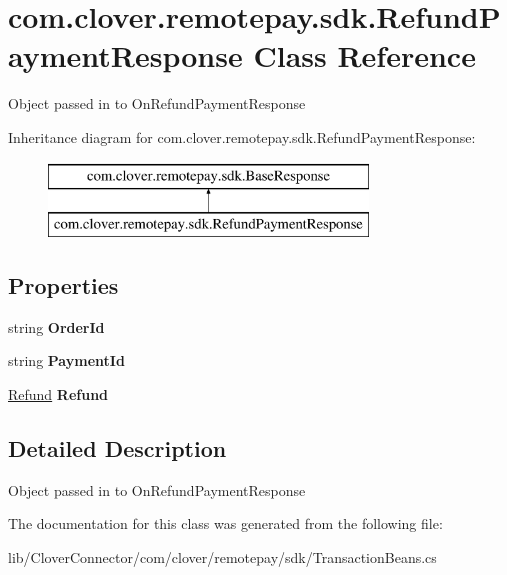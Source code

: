\hypertarget{classcom_1_1clover_1_1remotepay_1_1sdk_1_1_refund_payment_response}{}\section{com.\+clover.\+remotepay.\+sdk.\+Refund\+Payment\+Response Class Reference}
\label{classcom_1_1clover_1_1remotepay_1_1sdk_1_1_refund_payment_response}


Object passed in to On\+Refund\+Payment\+Response  


Inheritance diagram for com.\+clover.\+remotepay.\+sdk.\+Refund\+Payment\+Response\+:\begin{figure}[H]
\begin{center}
\leavevmode
\includegraphics[height=2.000000cm]{classcom_1_1clover_1_1remotepay_1_1sdk_1_1_refund_payment_response}
\end{center}
\end{figure}
\subsection*{Properties}
\begin{DoxyCompactItemize}
\item 
\mbox{\label{classcom_1_1clover_1_1remotepay_1_1sdk_1_1_refund_payment_response_afb086e350f7151acac3e614964bcc2b1}} 
string {\bfseries Order\+Id}
\item 
\mbox{\label{classcom_1_1clover_1_1remotepay_1_1sdk_1_1_refund_payment_response_a3d3940e72faa529aaeff9eca39eb2896}} 
string {\bfseries Payment\+Id}
\item 
\mbox{\label{classcom_1_1clover_1_1remotepay_1_1sdk_1_1_refund_payment_response_adeb3365694ecf3d5fbff2d77cf7aa7f8}} 
\hyperlink{classcom_1_1clover_1_1sdk_1_1v3_1_1payments_1_1_refund}{Refund} {\bfseries Refund}
\end{DoxyCompactItemize}


\subsection{Detailed Description}
Object passed in to On\+Refund\+Payment\+Response 



The documentation for this class was generated from the following file\+:\begin{DoxyCompactItemize}
\item 
lib/\+Clover\+Connector/com/clover/remotepay/sdk/Transaction\+Beans.\+cs\end{DoxyCompactItemize}
